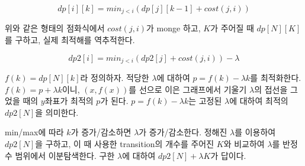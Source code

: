 $$dp[i][k] = min_{j<i} (dp[j][k-1] + cost(j, i))$$

위와 같은 형태의 점화식에서 $cost(j, i)$가 monge 하고, $K$가 주어질 때 $dp[N][K]$를 구하고, 실제 최적해를 역추적한다.

$$dp2[i] = min_{j<i} (dp2[j] + cost(j, i)) - \lambda$$

$f(k) = dp[N][k]$라 정의하자.
적당한 $\lambda$에 대하여 $p=f(k)-\lambda k$를 최적화한다.
$f(k)=p + \lambda k$이니, $(x, f(x))$를 선으로 이은 그래프에서 기울기 $\lambda$의 접선을 그었을 때의 $y$좌표가 최적의 $p$가 된다.
$p=f(k)-\lambda k$는 고정된 $\lambda$에 대하여 최적의 $dp2[N]$을 의미한다.

min/max에 따라 $k$가 증가/감소하면 $\lambda$가 증가/감소한다.
정해진 $\lambda$를 이용하여 $dp2[N]$을 구하고, 이 때 사용한 transition의 개수를 주어진 $K$와 비교하여 $\lambda$를 반정수 범위에서 이분탐색한다.
구한 $\lambda$에 대하여 $dp2[N]+\lambda K$가 답이다.